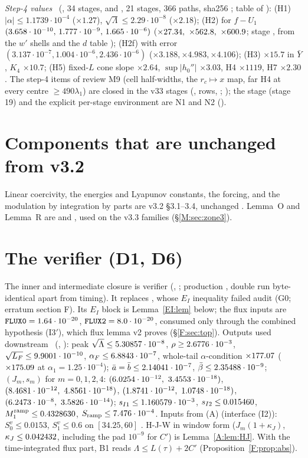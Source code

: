 \documentclass[11pt]{article}
\begin{document}
\noindent\emph{Step-4 values} \tC\ (, 34 stages, and , 21 stages, 366 paths, sha256 ; table of ): (H1) $|\alpha|\le1.1739\cdot10^{-4}$ ($\times1.27$), $\sqrt\Lambda\le2.29\cdot10^{-8}$ ($\times2.18$); (H2) for $f-U_1$ $(3.658\cdot10^{-10},\,1.777\cdot10^{-9},\,1.665\cdot10^{-6})$ ($\times27.34,\ \times562.8,\ \times600.9$; stage , from the $w'$ shells and the $d$ table ); (H2f) with error $(3.137\cdot10^{-7},1.004\cdot10^{-6},2.436\cdot10^{-6})$ ($\times3.188,\times4.983,\times4.106$); (H3) $\times15.7$ in $\bar Y$, $K_4$ $\times10.7$; (H5) fixed-$L$ cone slope $\times2.64$, $\sup|h_0''|$ $\times3.03$, H4 $\times1119$, H7 $\times2.30$. The step-4 items of review M9 (cell half-widths, the $r_c\mapsto x$ map, far H4 at every centre $\ge490\lambda_1$) are closed in the v33 stages (,  rows, ; ); the stage  (stage 19) and the explicit per-stage environment are N1 and N2 ().

\section{Components that are unchanged from v3.2}\label{M:sec:unchanged}
Linear coercivity, the energies and Lyapunov constants, the forcing, and the modulation by integration by parts are v3.2 \S3.1--3.4, unchanged \tC. Lemma~O and Lemma~R are  and , used on the v3.3 families (\S\ref{M:sec:zone3}).

\section{The verifier (D1, D6)}\label{M:sec:verifier}
The inner and intermediate closure is verifier  (, ; production , double run byte-identical apart from timing). It replaces , whose $E_I$ inequality failed audit (G0; erratum section F). Its $E_I$ block is Lemma~\ref{EI:lem} below; the flux inputs are $\fn{FLUX0}=1.64\cdot10^{-20}$, $\fn{FLUX2}=8.0\cdot10^{-20}$, consumed only through the combined hypothesis (I3$'$), which flux lemma v2 proves (\S\ref{F:sec:top}). Outputs used downstream \tC\ (, ): peak $\sqrt\Lambda\le5.30857\cdot10^{-8}$, $\rho\ge2.6776\cdot10^{-3}$, $\sqrt{L_F}\le9.9001\cdot10^{-10}$, $\alpha_F\le6.8843\cdot10^{-7}$, whole-tail $\alpha$-condition $\times177.07$ ($\times175.09$ at $\alpha_1=1.25\cdot10^{-4}$); $\bar a=\bar b\le2.14041\cdot10^{-7}$, $\bar\beta\le2.35488\cdot10^{-9}$; $(J_m,s_m)$ for $m=0,1,2,4$: $(6.0254\cdot10^{-12},\ 3.4553\cdot10^{-18})$, $(8.4681\cdot10^{-12},\ 4.8561\cdot10^{-18})$, $(1.8741\cdot10^{-12},\ 1.0748\cdot10^{-18})$, $(6.2473\cdot10^{-8},\ 3.5826\cdot10^{-14})$; $s_{I1}\le1.160579\cdot10^{-3}$, $s_{I2}\le0.015460$, $M_1^{\rm ramp}\le0.4328630$, $S_{\rm ramp}\le7.476\cdot10^{-4}$. Inputs from (A) (interface (I2)): $S^v_0\le0.0153$, $S^v_1\le0.6$ on $[34.25,60]$ \tB. H-J-W in window form ($J_m(1+\kappa_J)$, $\kappa_J\le0.042432$, including the pad $10^{-9}$ for $C'$) is Lemma~\ref{A:lem:HJ}. With the time-integrated flux part, B1 reads $\Lambda\le L(\tau)+2C'$ (Proposition~\ref{F:prop:abs}).
\end{document}
